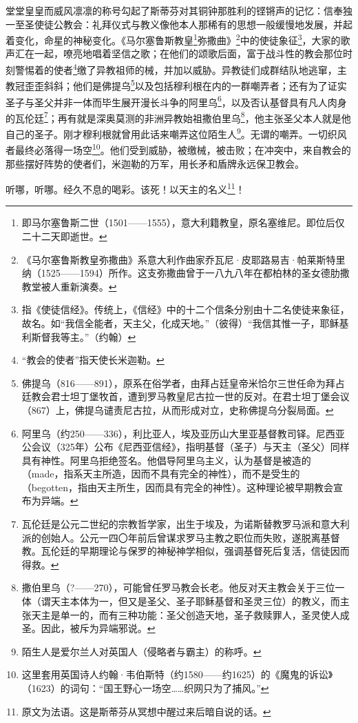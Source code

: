 \par 堂堂皇皇而威风凛凛的称号勾起了斯蒂芬对其铜钟那胜利的铿锵声的记忆：信奉独一至圣使徒公教会：礼拜仪式与教义像他本人那稀有的思想一般缓慢地发展，并起着变化，命星的神秘变化。《马尔塞鲁斯教皇\footnote{即马尔塞鲁斯二世（1501——1555），意大利籍教皇，原名塞维尼。即位后仅二十二天即逝世。}弥撒曲》\footnote{《马尔塞鲁斯教皇弥撒曲》系意大利作曲家乔瓦尼·皮耶路易吉·帕莱斯特里纳（1525——1594）所作。这支弥撒曲曾于一八九八年在都柏林的圣女德肋撒教堂被人重新演奏。}中的使徒象征\footnote{指《使徒信经》。传统上，《信经》中的十二个信条分别由十二名使徒来象征，故名。如“我信全能者，天主父，化成天地。”（彼得）“我信其惟一子，耶稣基利斯督我等主。”（约翰）}，大家的歌声汇在一起，嘹亮地唱着坚信之歌；在他们的颂歌后面，富于战斗性的教会那位时刻警惕着的使者\footnote{“教会的使者”指天使长米迦勒。}缴了异教祖师的械，并加以威胁。异教徒们成群结队地逃窜，主教冠歪歪斜斜；他们是佛提乌\footnote{佛提乌（816——891），原系在俗学者，由拜占廷皇帝米恰尔三世任命为拜占廷教会君士坦丁堡牧首，遭到罗马教皇尼古拉一世的反对。在君士坦丁堡会议（867）上，佛提乌谴责尼古拉，从而形成对立，史称佛提乌分裂局面。}以及包括穆利根在内的一群嘲弄者；还有为了证实圣子与圣父并非一体而毕生展开漫长斗争的阿里乌\footnote{阿里乌（约250——336），利比亚人，埃及亚历山大里亚基督教司铎。尼西亚公会议（325年）公布《尼西亚信经》，指明基督（圣子）与天主（圣父）同样具有神性。阿里乌拒绝签名。他倡导阿里乌主义，认为基督是被造的（made，指系天主所造，因而不具有完全的神性），而不是受生的（begotten，指由天主所生，因而具有完全的神性）。这种理论被早期教会宣布为异端。}，以及否认基督具有凡人肉身的瓦伦廷\footnote{瓦伦廷是公元二世纪的宗教哲学家，出生于埃及，为诺斯替教罗马派和意大利派的创始人。公元一四〇年前后曾谋求罗马主教之职位而失败，遂脱离基督教。瓦伦廷的早期理论与保罗的神秘神学相似，强调基督死后复活，信徒因而得救。}；再有就是深奥莫测的非洲异教始祖撒伯里乌\footnote{撒伯里乌（?——270），可能曾任罗马教会长老。他反对天主教会关于三位一体（谓天主本体为一，但又是圣父、圣子耶稣基督和圣灵三位）的教义，而主张天主是单一的，而有三种功能：圣父创造天地，圣子救赎罪人，圣灵使人成圣。因此，被斥为异端邪说。}，他主张圣父本人就是他自己的圣子。刚才穆利根就曾用此话来嘲弄这位陌生人\footnote{陌生人是爱尔兰人对英国人（侵略者与霸主）的称呼。}。无谓的嘲弄。一切织风者最终必落得一场空\footnote{这里套用英国诗人约翰·韦伯斯特（约1580——约1625）的《魔鬼的诉讼》（1623）的词句：“国王野心一场空……织网只为了捕风。”}。他们受到威胁，被缴械，被击败；在冲突中，来自教会的那些摆好阵势的使者们，米迦勒的万军，用长矛和盾牌永远保卫教会。
\par 听哪，听哪。经久不息的喝彩。该死！以天主的名义\footnote{原文为法语。这是斯蒂芬从冥想中醒过来后暗自说的话。}！
